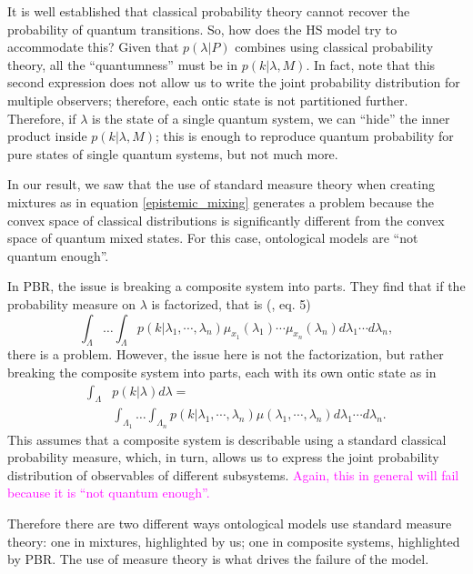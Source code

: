 \documentclass[10pt,twocolumn, nofootinbib]{revtex4-2}
\begin{document}
It is well established that classical probability theory cannot recover the probability of quantum transitions. So, how does the HS model try to accommodate this? Given that $p(\lambda|P)$ combines using classical probability theory, all the ``quantumness'' must be in $p(k|\lambda, M)$. In fact, note that this second expression does not allow us to write the joint probability distribution for multiple observers; therefore, each ontic state is not partitioned further. Therefore, if $\lambda$ is the state of a single quantum system, we can ``hide'' the inner product inside $p(k|\lambda, M)$; this is enough to reproduce quantum probability for pure states of single quantum systems, but not much more.

In our result, we saw that the use of standard measure theory when creating mixtures as in equation \ref{epistemic_mixing} generates a problem because the convex space of classical distributions is significantly different from the convex space of quantum mixed states. For this case, ontological models are ``not quantum enough''.

In PBR, the issue is breaking a composite system into parts. They find  that if the probability measure on $\lambda$ is factorized, that is (\cite{PBR:2012}, eq. 5) 
\begin{equation}
	\int_{\Lambda} \dots \int_{\Lambda} p(k | \lambda_1, \cdots, \lambda_n) \mu_{x_1}(\lambda_1)\cdots\mu_{x_n}(\lambda_n) d\lambda_1 \cdots d\lambda_n ,
\end{equation}
there is a problem. However, the issue here is not the factorization, but rather breaking the composite system into parts, each with its own ontic state as in 
\begin{equation}
	\begin{aligned}
	\int_\Lambda &p(k | \lambda) d\lambda = \\
	&\int_{\Lambda_1} \dots \int_{\Lambda_n} p(k | \lambda_1, \cdots, \lambda_n) \mu(\lambda_1, \cdots, \lambda_n) d\lambda_1 \cdots d\lambda_n.
	\end{aligned}
\end{equation}
This assumes that a composite system is describable using a standard classical probability measure, which, in turn, allows us to express the joint probability distribution of observables of different subsystems. \textcolor{magenta}{Again, this in general will fail because it is ``not quantum enough''.}

Therefore there are two different ways ontological models use standard measure theory: one in mixtures, highlighted by us; one in composite systems, highlighted by PBR. The use of measure theory is what drives the failure of the model.
\end{document}
